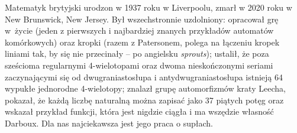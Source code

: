 \begin{remark}
    Matematyk brytyjski urodzon w 1937 roku w Liverpoolu, zmarł w 2020 roku w New Brunswick, New Jersey.
    Był wszechstronnie uzdolniony: opracował grę w~życie (jeden z pierwszych i najbardziej znanych przykładów automatów komórkowych) oraz kropki (razem z Patersonem, polega na łączeniu kropek liniami tak, by się nie przecinały -- po angielsku \emph{sprouts}); ustalił, że poza sześcioma regularnymi 4-wielotopami oraz dwoma nieskończonymi seriami zaczynającymi się od dwugraniastosłupa i antydwugraniastosłupa istnieją 64 wypukłe jednorodne 4-wielotopy; znalazł grupę automorfizmów kraty Leecha, pokazał, że każdą liczbę naturalną można zapisać jako 37 piątych potęg oraz wskazał przykład funkcji, która jest nigdzie ciągła i ma wszędzie własność Darboux.
    Dla nas najciekawsza jest jego praca \cite{conway1970} o supłach.
\end{remark}


